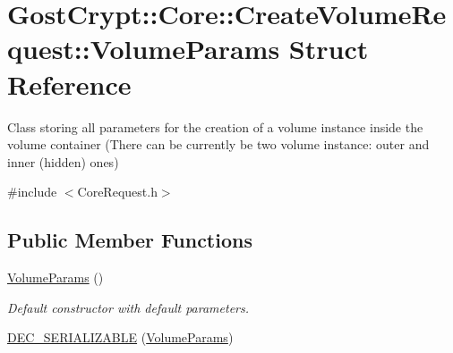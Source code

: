 \hypertarget{struct_gost_crypt_1_1_core_1_1_create_volume_request_1_1_volume_params}{}\section{Gost\+Crypt\+:\+:Core\+:\+:Create\+Volume\+Request\+:\+:Volume\+Params Struct Reference}
\label{struct_gost_crypt_1_1_core_1_1_create_volume_request_1_1_volume_params}


Class storing all parameters for the creation of a volume instance inside the volume container (There can be currently be two volume instance\+: outer and inner (hidden) ones)  




{\ttfamily \#include $<$Core\+Request.\+h$>$}

\subsection*{Public Member Functions}
\begin{DoxyCompactItemize}
\item 
\hyperlink{struct_gost_crypt_1_1_core_1_1_create_volume_request_1_1_volume_params_a83f6db640ad58de631f17d25f07228a3}{Volume\+Params} ()
\begin{DoxyCompactList}\small\item\em Default constructor with default parameters. \end{DoxyCompactList}\item 
\hyperlink{struct_gost_crypt_1_1_core_1_1_create_volume_request_1_1_volume_params_a19fd49b4e4660c2bce8f068f4d504db6}{D\+E\+C\+\_\+\+S\+E\+R\+I\+A\+L\+I\+Z\+A\+B\+LE} (\hyperlink{struct_gost_crypt_1_1_core_1_1_create_volume_request_1_1_volume_params}{Volume\+Params})
\end{DoxyCompactItemize}
